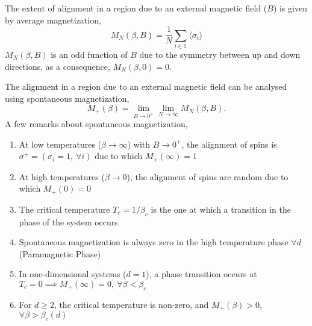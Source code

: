 \documentclass[letterpaper,english,12pt]{article}
\begin{document}
\begin{defn} The extent of alignment in a region due to an external magnetic field ($B$) is given by average magnetization,
	$$M_{N}(\beta,B)=\frac{1}{N}\sum_{i\in \mathbb{L}}\langle\sigma_{i}\rangle$$
$M_{N}(\beta,B)$ is an odd function of $B$ due to the symmetry between up and down directions, as a consequence, $M_{N}(\beta,0) = 0$. 

\end{defn}

\begin{defn} The alignment in a region due to an external magnetic field can be analysed using spontaneous magnetization,
$$M_{+}(\beta) = \lim \limits_{B \rightarrow 0^{+}}\limits \lim_{N\rightarrow\infty}M_{N}(\beta,B).$$
A few remarks about spontaneous magnetization,
\begin{enumerate}
	\item At low temperatures ($\beta \to \infty$) with $B \to 0^{+}$, the alignment of spins is $\sigma^{+} = (\sigma_{i} = 1,~\forall i)$ due to which $M_{+}(\infty) = 1$
	\item At high temperatures ($\beta \to 0$), the alignment of spins are random due to which $M_{+}(0) = 0$
	\item The critical temperature $T_{c} = 1/\beta_{c}$ is the one at which  a transition in the phase of the system occurs
	\item Spontaneous magnetization is always zero in the high temperature phase $\forall d$ (Paramagnetic Phase)
	\item In one-dimensional systems ($d=1$), a phase transition occurs at $T_{c} = 0 \implies M_{+}(\infty) = 0,~\forall \beta < \beta_{c}$
	\item For $d\geq 2$, the critical temperature is non-zero, and $M_{+}(\beta)>0$, $\forall \beta > \beta_{c}(d)$
	\end{enumerate}
\end{defn}
\end{document}
